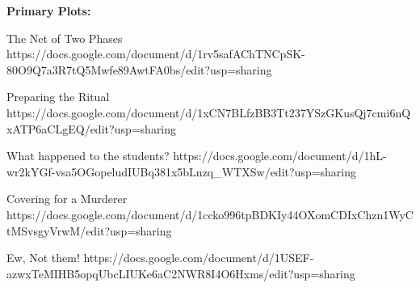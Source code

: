 \documentclass[char]{GL2020}
\begin{document}
\name{\cPresident{}}








\textbf{Primary Plots:}

The Net of Two Phases https://docs.google.com/document/d/1rv5safAChTNCpSK-80O9Q7a3R7tQ5Mwfe89AwtFA0bs/edit?usp=sharing

Preparing the Ritual https://docs.google.com/document/d/1xCN7BLfzBB3Tt237YSzGKusQj7cmi6nQxATP6aCLgEQ/edit?usp=sharing

What happened to the students? https://docs.google.com/document/d/1hL-wr2kYGf-vsa5OGopeludIUBq381x5bLnzq_WTXSw/edit?usp=sharing

Covering for a Murderer  https://docs.google.com/document/d/1ccko996tpBDKIy44OXomCDIxChzn1WyCtMSvsgyVrwM/edit?usp=sharing

Ew, Not them! https://docs.google.com/document/d/1USEF-azwxTeMIHB5opqUbcLIUKe6aC2NWR8I4O6Hxms/edit?usp=sharing
\end{document}
